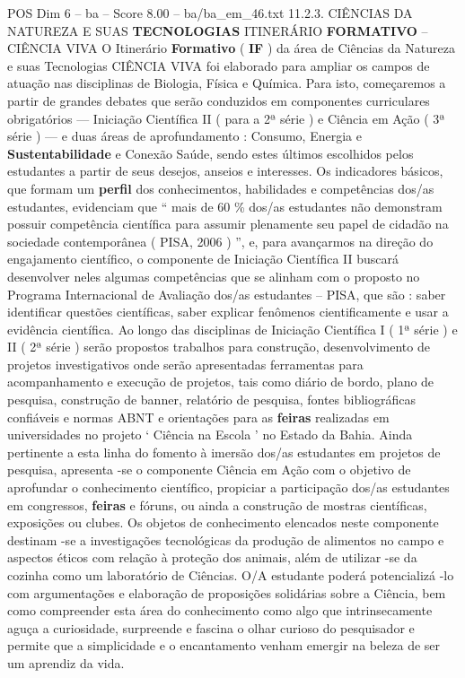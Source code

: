 \begin{textsample}{POS Dim 6 – ba – Score 8.00 – ba/ba\_em\_46.txt}  \label{ex:f6_pos_077}
11.2.3.
CIÊNCIAS DA NATUREZA E SUAS \textbf{TECNOLOGIAS} ITINERÁRIO \textbf{FORMATIVO} – CIÊNCIA VIVA O Itinerário \textbf{Formativo} ( \textbf{IF} ) da área de Ciências da Natureza e suas Tecnologias CIÊNCIA VIVA foi elaborado para ampliar os campos de atuação nas disciplinas de Biologia, Física e Química.
Para isto, começaremos a partir de grandes debates que serão conduzidos em componentes curriculares obrigatórios — Iniciação Científica II ( para a 2ª série ) e Ciência em Ação ( 3ª série ) — e duas áreas de aprofundamento : Consumo, Energia e \textbf{Sustentabilidade} e Conexão Saúde, sendo estes últimos escolhidos pelos estudantes a partir de seus desejos, anseios e interesses.
Os indicadores básicos, que formam um \textbf{perfil} dos conhecimentos, habilidades e competências dos/as estudantes, evidenciam que “ mais de 60 \% dos/as estudantes não demonstram possuir competência científica para assumir plenamente seu papel de cidadão na sociedade contemporânea ( PISA, 2006 ) ”, e, para avançarmos na direção do engajamento científico, o componente de Iniciação Científica II buscará desenvolver neles algumas competências que se alinham com o proposto no Programa Internacional de Avaliação dos/as estudantes – PISA, que são : saber identificar questões científicas, saber explicar fenômenos cientificamente e usar a evidência científica.
Ao longo das disciplinas de Iniciação Científica I ( 1ª série ) e II ( 2ª série ) serão propostos trabalhos para construção, desenvolvimento de projetos investigativos onde serão apresentadas ferramentas para acompanhamento e execução de projetos, tais como diário de bordo, plano de pesquisa, construção de banner, relatório de pesquisa, fontes bibliográficas confiáveis e normas ABNT e orientações para as \textbf{feiras} realizadas em universidades no projeto ‘ Ciência na Escola ’ no Estado da Bahia.
Ainda pertinente a esta linha do fomento à imersão dos/as estudantes em projetos de pesquisa, apresenta -se o componente Ciência em Ação com o objetivo de aprofundar o conhecimento científico, propiciar a participação dos/as estudantes em congressos, \textbf{feiras} e fóruns, ou ainda a construção de mostras científicas, exposições ou clubes.
Os objetos de conhecimento elencados neste componente destinam -se a investigações tecnológicas da produção de alimentos no campo e aspectos éticos com relação à proteção dos animais, além de utilizar -se da cozinha como um laboratório de Ciências.
O/A estudante poderá potencializá -lo com argumentações e elaboração de proposições solidárias sobre a Ciência, bem como compreender esta área do conhecimento como algo que intrinsecamente aguça a curiosidade, surpreende e fascina o olhar curioso do pesquisador e permite que a simplicidade e o encantamento venham emergir na beleza de ser um aprendiz da vida.

\end{textsample}
